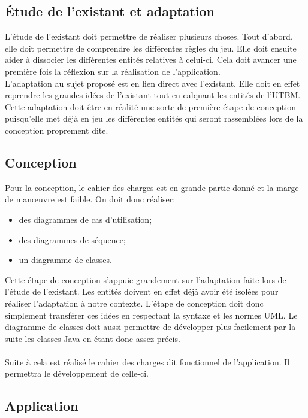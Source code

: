 \documentclass[a4paper, 11pt]{article}
\begin{document}
		\subsection{Étude de l'existant et adaptation}
		
		L'étude de l'existant doit permettre de réaliser plusieurs choses. Tout d'abord, elle doit permettre de comprendre les différentes règles du jeu. Elle doit ensuite aider à dissocier les différentes entités relatives à celui-ci. Cela doit avancer une première fois la réflexion sur la réalisation de l'application. \\
		L'adaptation au sujet proposé est en lien direct avec l'existant. Elle doit en effet reprendre les grandes idées de l'existant tout en calquant les entités de l'UTBM. Cette adaptation doit être en réalité une sorte de première étape de conception puisqu'elle met déjà en jeu les différentes entités qui seront rassemblées lors de la conception proprement dite.
			
		\subsection{Conception}
		
		Pour la conception, le cahier des charges est en grande partie donné et la marge de manœuvre est faible. On doit donc réaliser:
		\begin{itemize}
			\item des diagrammes de cas d'utilisation;
			\item des diagrammes de séquence;
			\item un diagramme de classes.
		\end{itemize}
		Cette étape de conception s'appuie grandement sur l'adaptation faite lors de l'étude de l'existant. Les entités doivent en effet déjà avoir été isolées pour réaliser l'adaptation à notre contexte. L'étape de conception doit donc simplement transférer ces idées en respectant la syntaxe et les normes UML. Le diagramme de classes doit aussi permettre de développer plus facilement par la suite les classes Java en étant donc assez précis. \\ \ \\
		Suite à cela est réalisé le cahier des charges dit fonctionnel de l'application. Il permettra le développement de celle-ci.
		
		\subsection{Application}
		
\end{document}
